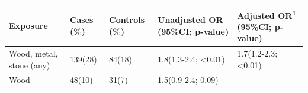\documentclass[
]{article}
\begin{document}
\begin{longtable}[]{@{}lllll@{}}
\toprule
\begin{minipage}[b]{0.20\columnwidth}\raggedright
Exposure\strut
\end{minipage} & \begin{minipage}[b]{0.08\columnwidth}\raggedright
Cases (\%)\strut
\end{minipage} & \begin{minipage}[b]{0.10\columnwidth}\raggedright
Controls (\%)\strut
\end{minipage} & \begin{minipage}[b]{0.24\columnwidth}\raggedright
Unadjusted OR (95\%CI; p-value)\strut
\end{minipage} & \begin{minipage}[b]{0.24\columnwidth}\raggedright
Adjusted OR\textsuperscript{1} (95\%CI; p-value)\strut
\end{minipage}\tabularnewline
\midrule
\endhead
\begin{minipage}[t]{0.20\columnwidth}\raggedright
Wood, metal, stone (any)\strut
\end{minipage} & \begin{minipage}[t]{0.08\columnwidth}\raggedright
139(28)\strut
\end{minipage} & \begin{minipage}[t]{0.10\columnwidth}\raggedright
84(18)\strut
\end{minipage} & \begin{minipage}[t]{0.24\columnwidth}\raggedright
1.8(1.3-2.4; \textless0.01)\strut
\end{minipage} & \begin{minipage}[t]{0.24\columnwidth}\raggedright
1.7(1.2-2.3; \textless0.01)\strut
\end{minipage}\tabularnewline
\begin{minipage}[t]{0.20\columnwidth}\raggedright
Wood\strut
\end{minipage} & \begin{minipage}[t]{0.08\columnwidth}\raggedright
48(10)\strut
\end{minipage} & \begin{minipage}[t]{0.10\columnwidth}\raggedright
31(7)\strut
\end{minipage} & \begin{minipage}[t]{0.24\columnwidth}\raggedright
1.5(0.9-2.4; 0.09)\strut
\end{minipage} & \begin{minipage}[t]{0.24\columnwidth}\raggedright

\end{minipage}
\end{longtable}
\end{document}
